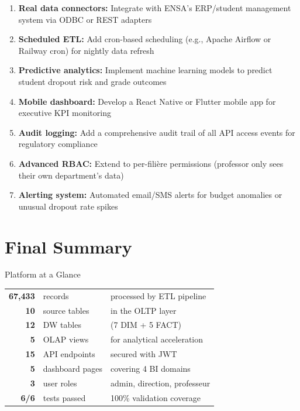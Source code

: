 \documentclass[12pt, a4paper]{report}
\begin{document}
\begin{enumerate}
  \item \textbf{Real data connectors:} Integrate with ENSA's ERP/student management system via ODBC or REST adapters
  \item \textbf{Scheduled ETL:} Add cron-based scheduling (e.g., Apache Airflow or Railway cron) for nightly data refresh
  \item \textbf{Predictive analytics:} Implement machine learning models to predict student dropout risk and grade outcomes
  \item \textbf{Mobile dashboard:} Develop a React Native or Flutter mobile app for executive KPI monitoring
  \item \textbf{Audit logging:} Add a comprehensive audit trail of all API access events for regulatory compliance
  \item \textbf{Advanced RBAC:} Extend to per-filière permissions (professor only sees their own department's data)
  \item \textbf{Alerting system:} Automated email/SMS alerts for budget anomalies or unusual dropout rate spikes
\end{enumerate}

\section{Final Summary}

\begin{kpibox}{Platform at a Glance}
\begin{center}
\begin{tabular}{rll}
\textbf{67,433} & records & processed by ETL pipeline \\
\textbf{10} & source tables & in the OLTP layer \\
\textbf{12} & DW tables & (7 DIM + 5 FACT) \\
\textbf{5} & OLAP views & for analytical acceleration \\
\textbf{15} & API endpoints & secured with JWT \\
\textbf{5} & dashboard pages & covering 4 BI domains \\
\textbf{3} & user roles & admin, direction, professeur \\
\textbf{6/6} & tests passed & 100\% validation coverage \\
\end{tabular}
\end{center}
\end{kpibox}
\end{document}
